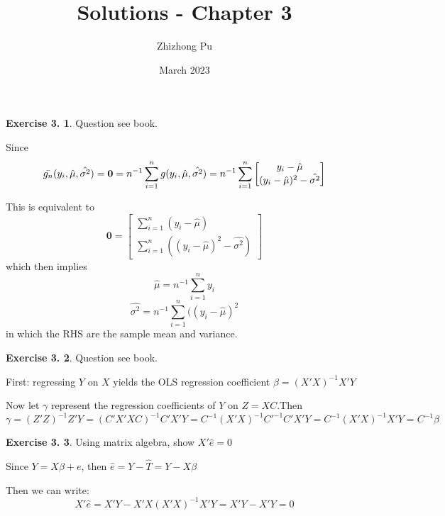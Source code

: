 \documentclass[12pt,letterpaper,reqno]{amsart}
\theoremstyle{plain}
\theoremstyle{definition}
\theoremstyle{definition}
\newtheorem{Exercise}{Exercise 3.}
\numberwithin{equation}{section}
\begin{document}
\author{Zhizhong Pu}
\title{Solutions - Chapter 3}
\date{March 2023}
\maketitle

\thispagestyle{empty}

\begin{Exercise} Question see book.

    Since 
    \[
        \Bar{g_n}(y_i, \hat{\mu}, \hat{\sigma^2}) = \mathbf{0} = n^{-1}\sum_{i=1}^n g(y_i, \hat{\mu}, \hat{\sigma^2}) = n^{-1}\sum_{i=1}^n
        \begin{bmatrix} 
        y_i - \hat{\mu} \\
        (y_i - \hat{\mu})^2 - \hat{\sigma^2} 
        \end{bmatrix}
    \]

    This is equivalent to 
    \[ \mathbf{0} =
     \begin{bmatrix} 
       \sum_{i=1}^n (y_i - \hat{\mu}) \\
       \sum_{i=1}^n ((y_i - \hat{\mu})^2 - \hat{\sigma^2} )
        \end{bmatrix}
    \]
    which then implies 
    \[
    \hat{\mu} = n^{-1} \sum_{i=1}^n y_i
    \]
    \[
    \hat{\sigma^2} = n^{-1} \sum_{i=1}^n ((y_i - \hat{\mu})^2
    \]
    in which the RHS are the sample mean and variance.

    
    
\end{Exercise}

\begin{Exercise} Question see book.

    First: regressing $Y$ on $X$ yields the OLS regression coefficient $\beta = (X'X)^{-1}X'Y$
    
    Now let $\gamma$ represent the regression coefficients of $Y$ on $Z=XC$.Then
    \[
        \gamma = (Z'Z)^{-1}Z'Y = (C'X'XC)^{-1}C'X'Y = C^{-1}(X'X)^{-1}C'^{-1}C'X'Y = C^{-1}(X'X)^{-1}X'Y = C^{-1}\beta
    \]
\end{Exercise}

\begin{Exercise} Using matrix algebra, show $X'\hat{e}=0$
    
    Since $Y=X\beta + e$, then $\hat{e} = Y - \hat{T} = Y-X\beta$
    
    Then we can write:
    \[
    X'\hat{e}=X'Y-X'X(X'X)^{-1}X'Y = X'Y -X'Y =0
    \]
\end{Exercise}
\end{document}
